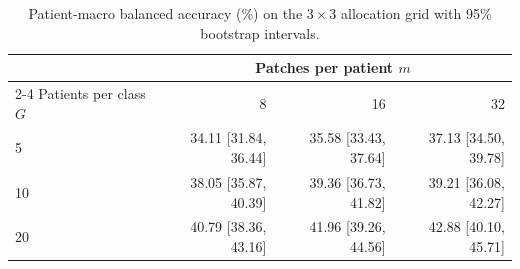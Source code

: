 \begin{table}[htbp]
\centering
\small
\begin{tabular}{lrrr}
\toprule
& \multicolumn{3}{c}{Patches per patient $m$} \\
\cmidrule(l){2-4}
Patients per class $G$ & 8 & 16 & 32 \\
\midrule
5 & 34.11 [31.84, 36.44] & 35.58 [33.43, 37.64] & 37.13 [34.50, 39.78] \\
10 & 38.05 [35.87, 40.39] & 39.36 [36.73, 41.82] & 39.21 [36.08, 42.27] \\
20 & 40.79 [38.36, 43.16] & 41.96 [39.26, 44.56] & 42.88 [40.10, 45.71] \\
\bottomrule
\end{tabular}
\caption{Patient-macro balanced accuracy (\%) on the $3\times 3$ allocation grid with 95\% bootstrap intervals.}
\label{tab:breadth_grid_accuracies}
\end{table}
